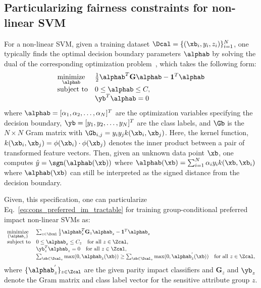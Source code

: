 \documentclass{article}
\begin{document}
\newpage
\begin{appendix}

\onecolumn
\clearpage
\normalsize



\section{Particularizing fairness constraints for non-linear SVM} \label{app:non-lin-svm}

For a non-linear SVM, given a training dataset $\Dcal = \{(\xb_i, y_i, z_i)\}_{i=1}^{N}$, one typically finds the optimal decision boundary parameters $\alphab$ by
solving the dual of the corresponding optimization problem~\cite{gentle2012handbook}, which takes the following form:
\begin{align}
       \begin{array}{ll} \nonumber
		\underset{\alphab}{\mbox{minimize}} &    \frac{1}{2} \alphab^{T}\mathbf{G}\alphab - \mathbf{1}^T \alphab  \\
        \mbox{subject to} & 0 \leq \alphab \leq C, \\
        &  \yb^T \alphab = 0
    \end{array}
\end{align}
where $\alphab = [\alpha_1, \alpha_2, \ldots, \alpha_N]^T$ are the optimization variables specifying the decision boundary,
$\yb = [y_1, y_2, \ldots, y_N]^T$ are the class labels,
and $\Gb$ is the $N \times N$ Gram matrix with
$\Gb_{i,j} = y_iy_jk(\xb_i, \xb_j)$. Here, the kernel function, $k(\xb_i, \xb_j) = \phi(\xb_i) \cdot \phi(\xb_j)$ denotes the inner product between a pair of transformed feature vectors.
Then, given an unknown data point $\xb$, one computes $\hat{y} = \sgn(\alphab(\xb))$  where $\alphab(\xb) = \sum_{i=1}^{N} \alpha_i y_i k(\xb, \xb_i)$ where $\alphab(\xb)$ can still be interpreted as the signed distance from the decision boundary.

Given, this specification, one can particularize Eq.~\ref{eq:cons_preferred_im_tractable} for training group-conditional preferred impact non-linear SVMs as:
\begin{align}
       \begin{array}{ll} \nonumber
		\underset{\{\alphab_z\}}{\mbox{minimize}} &  \sum_{z \in \Zcal}  \frac{1}{2} \alphab_{z}^{T}\mathbf{G}_z\alphab_z  - \mathbf{1}^T \alphab_z  \\
        \mbox{subject to} & 0 \leq \alphab_z \leq C_z \quad \mbox{for all } z \in \Zcal, \\
        & \yb_{z}^{T} \alphab_z   = 0 \quad \mbox{for all } z \in \Zcal, \\
        & \sum_{\xb \in \Dcal_z} \max(0, \alphab_z(\xb)) \geq \sum_{\xb \in \Dcal_z} \max(0, \alphab_{z}^{'}(\xb)) \quad \mbox{for all } z \in \Zcal, \\
    \end{array}
\end{align}
where $\{\alphab_{z}^{'}\}_{z \in \Zcal}$ are the given parity impact classifiers and $\mathbf{G}_z$ and $\yb_z$ denote the Gram matrix and class label vector for the sensitive attribute group $z$.


\end{appendix}
\end{document}
